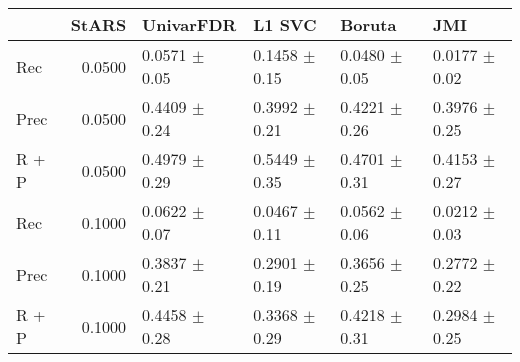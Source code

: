 \begin{tabular}{lrllll}
\toprule
{} &  StARS &          UnivarFDR &             L1 SVC &             Boruta &                JMI \\
\midrule
Rec   & 0.0500 &  0.0571 $\pm$ 0.05 &  0.1458 $\pm$ 0.15 &  0.0480 $\pm$ 0.05 &  0.0177 $\pm$ 0.02 \\
Prec  & 0.0500 &  0.4409 $\pm$ 0.24 &  0.3992 $\pm$ 0.21 &  0.4221 $\pm$ 0.26 &  0.3976 $\pm$ 0.25 \\
R + P & 0.0500 &  0.4979 $\pm$ 0.29 &  0.5449 $\pm$ 0.35 &  0.4701 $\pm$ 0.31 &  0.4153 $\pm$ 0.27 \\
Rec   & 0.1000 &  0.0622 $\pm$ 0.07 &  0.0467 $\pm$ 0.11 &  0.0562 $\pm$ 0.06 &  0.0212 $\pm$ 0.03 \\
Prec  & 0.1000 &  0.3837 $\pm$ 0.21 &  0.2901 $\pm$ 0.19 &  0.3656 $\pm$ 0.25 &  0.2772 $\pm$ 0.22 \\
R + P & 0.1000 &  0.4458 $\pm$ 0.28 &  0.3368 $\pm$ 0.29 &  0.4218 $\pm$ 0.31 &  0.2984 $\pm$ 0.25 \\
\bottomrule
\end{tabular}
